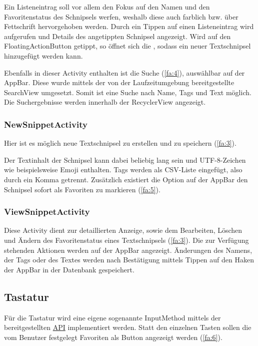 \documentclass[11pt]{article}
\begin{document}
	\noindent Ein Listeneintrag soll vor allem den Fokus auf den Namen und den Favoritenstatus des Schnipsels werfen, weshalb diese auch farblich bzw. über Fettschrift hervorgehoben werden. \newline
	Durch ein Tippen auf einen Listeneintrag wird  aufgerufen und Details des angetippten Schnipsel angezeigt.\newline
	Wird auf den FloatingActionButton getippt, so öffnet sich die , sodass ein neuer Textschnipsel hinzugefügt werden kann.\newline
	
	\noindent Ebenfalls in dieser Activity enthalten ist die Suche (\ref{fa:4}), auswählbar auf der AppBar. Diese wurde mittels der von der Laufzeitumgebung bereitgestellte SearchView umgesetzt. Somit ist eine Suche nach Name, Tags und Text möglich.
	Die Suchergebnisse werden innerhalb der RecyclerView angezeigt.
	
	\subsubsection{New\-Snippet\-Activity}
	\label{sec:new}
	Hier ist es möglich neue Textschnipsel zu erstellen und zu speichern (\ref{fa:3}). \newline
	
	\noindent Der Textinhalt der Schnipsel kann dabei beliebig lang sein und UTF-8-Zeichen wie beispielsweise Emoji enthalten. 
	Tags werden als CSV-Liste eingefügt, also durch ein Komma getrennt. 
	Zusätzlich existiert die Option auf der AppBar den Schnipsel sofort als Favoriten zu markieren (\ref{fa:5}). 
	
	\subsubsection{View\-Snippet\-Activity}
	\label{sec:view}
	Diese Activity dient zur detaillierten Anzeige, sowie dem Bearbeiten, Löschen und Ändern des Favoritenstatus eines Textschnipsels (\ref{fa:3}). 
	Die zur Verfügung stehenden Aktionen werden auf der AppBar angezeigt.
	Änderungen des Namens, der Tags oder des Textes werden nach Bestätigung mittels Tippen auf den Haken der AppBar in der Datenbank gespeichert.
	
	
	\subsection{Tastatur}
	\label{sec:keyboard}
	\noindent Für die Tastatur wird eine eigene sogenannte InputMethod mittels der bereitgestellten \href{https://developer.android.com/guide/topics/text/creating-input-method.html}{API} implementiert werden. Statt den einzelnen Tasten sollen die vom Benutzer festgelegt Favoriten als Button angezeigt werden (\ref{fa:6}).\\
	
\end{document}
